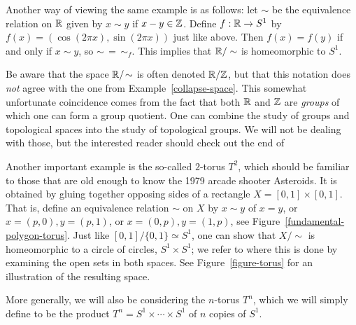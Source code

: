 \begin{example}
  Another way of viewing the same example is as follows: let $\sim$ be the equivalence relation on $\mathbb{R}$ given by $x \sim y$ if $x-y \in \mathbb{Z}$. Define $f : \mathbb{R} \to S^1$ by $f(x) = (\cos(2\pi x), \sin(2\pi x))$ just like above. Then $f(x) = f(y)$ if and only if $x \sim y$, so $\sim \,=\, \sim_f$. This implies that $\mathbb{R}/\sim$ is homeomorphic to $S^1$.
  
  Be aware that the space $\mathbb{R}/\!\sim$ is often denoted $\mathbb{R}/\mathbb{Z}$, but that this notation does \emph{not} agree with the one from Example~\ref{collapse-space}. This somewhat unfortunate coincidence comes from the fact that both $\mathbb{R}$ and $\mathbb{Z}$ are \emph{groups} of which one can form a group quotient. One can combine the study of groups and topological spaces into the study of topological groups. We will not be dealing with those, but the interested reader should check out the end of \cite[\S 22]{Mun}
\end{example}
\begin{example}
  \label{torus-example-gluing}
  Another important example is the so-called $2$-torus $T^2$, which should be familiar to those that are old enough to know the 1979 arcade shooter Asteroids. It is obtained by gluing together opposing sides of a rectangle $X=[0,1] \times [0,1]$. That is, define an equivalence relation $\sim$ on $X$ by $x \sim y$ of $x = y$, or $x=(p,0),y=(p,1)$, or $x=(0,p),y=(1,p)$, see Figure~\ref{fundamental-polygon-torus}. Just like $[0,1]/\{0,1\} \simeq S^1$, one can show that $X /\!\sim$ is homeomorphic to a circle of circles, $S^1 \times S^1$; we refer to \cite[\S 22]{Mun} where this is done by examining the open sets in both spaces. See Figure~\ref{figure-torus} for an illustration of the resulting space.
  
  More generally, we will also be considering the $n$-torus $T^n$, which we will simply define to be the product $T^n = S^1 \times \cdots \times S^1$ of $n$ copies of $S^1$.
\end{example}
